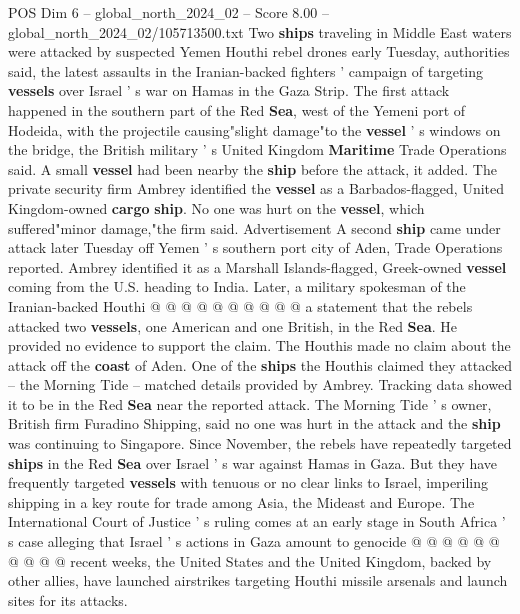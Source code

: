\begin{textsample}{POS Dim 6 – global\_north\_2024\_02 – Score 8.00 – global\_north\_2024\_02/105713500.txt}  \label{ex:f6_pos_192}
Two \textbf{ships} traveling in Middle East waters were attacked by suspected Yemen Houthi rebel drones early Tuesday, authorities said, the latest assaults in the Iranian-backed fighters ' campaign of targeting \textbf{vessels} over Israel ' s war on Hamas in the Gaza Strip.
The first attack happened in the southern part of the Red \textbf{Sea}, west of the Yemeni port of Hodeida, with the projectile causing"slight damage"to the \textbf{vessel} ' s windows on the bridge, the British military ' s United Kingdom \textbf{Maritime} Trade Operations said.
A small \textbf{vessel} had been nearby the \textbf{ship} before the attack, it added.
The private security firm Ambrey identified the \textbf{vessel} as a Barbados-flagged, United Kingdom-owned \textbf{cargo} \textbf{ship}.
No one was hurt on the \textbf{vessel}, which suffered"minor damage,"the firm said.
Advertisement A second \textbf{ship} came under attack later Tuesday off Yemen ' s southern port city of Aden, Trade Operations reported.
Ambrey identified it as a Marshall Islands-flagged, Greek-owned \textbf{vessel} coming from the U.S. heading to India.
Later, a military spokesman of the Iranian-backed Houthi @ @ @ @ @ @ @ @ @ @ a statement that the rebels attacked two \textbf{vessels}, one American and one British, in the Red \textbf{Sea}.
He provided no evidence to support the claim.
The Houthis made no claim about the attack off the \textbf{coast} of Aden.
One of the \textbf{ships} the Houthis claimed they attacked -- the Morning Tide -- matched details provided by Ambrey.
Tracking data showed it to be in the Red \textbf{Sea} near the reported attack.
The Morning Tide ' s owner, British firm Furadino Shipping, said no one was hurt in the attack and the \textbf{ship} was continuing to Singapore.
Since November, the rebels have repeatedly targeted \textbf{ships} in the Red \textbf{Sea} over Israel ' s war against Hamas in Gaza.
But they have frequently targeted \textbf{vessels} with tenuous or no clear links to Israel, imperiling shipping in a key route for trade among Asia, the Mideast and Europe.
The International Court of Justice ' s ruling comes at an early stage in South Africa ' s case alleging that Israel ' s actions in Gaza amount to genocide @ @ @ @ @ @ @ @ @ @ recent weeks, the United States and the United Kingdom, backed by other allies, have launched airstrikes targeting Houthi missile arsenals and launch sites for its attacks.

\end{textsample}
